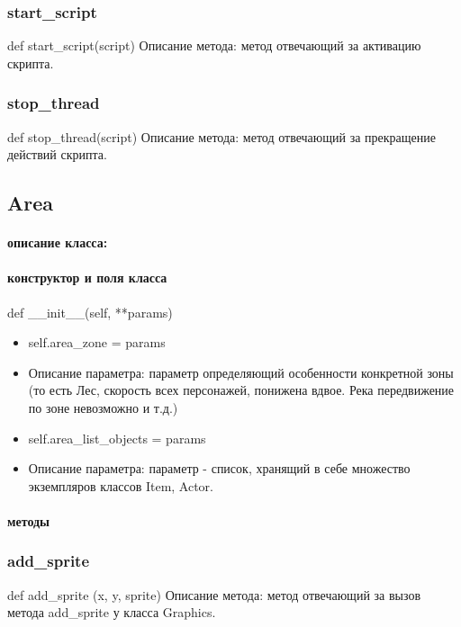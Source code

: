 \subsubsection{start\_script}
def start\_script(script)
Описание метода: метод отвечающий за активацию скрипта.
\subsubsection{stop\_thread}
def stop\_thread(script)
Описание метода: метод отвечающий за прекращение действий скрипта.


\subsection{Area}
\paragraph{описание класса:}
\paragraph{конструктор и поля класса}
def \_\_init\_\_(self, **params)
\begin{itemize}
	\item self.area\_zone = params
	\item Описание параметра: параметр определяющий особенности конкретной зоны (то есть Лес, скорость всех персонажей, понижена вдвое. Река передвижение по зоне невозможно и т.д.) %
	\item self.area\_list\_objects = params 
	\item Описание параметра: параметр - список, хранящий в себе множество экземпляров классов Item, Actor.
\end{itemize}
\paragraph{методы}
\subsubsection{add\_sprite}
def add\_sprite (x, y, sprite)
Описание метода: метод отвечающий за вызов метода add\_sprite у класса Graphics.
